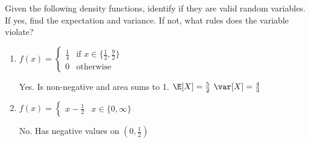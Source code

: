 \question Given the following density functions, identify if they are 
valid random variables. If yes, find the expectation and variance. If 
not, what rules does the variable violate?
\begin{enumerate}[label=(\alph*)]
\item
$f(x) = \begin{cases} \frac{1}{4} & \text{if } x \in \{\frac{1}{2}, 
\frac{9}{2}\} \\ 0 & \text{otherwise} \end{cases}$
\begin{solution}[2cm]
Yes. Is non-negative and area sums to 1.
$\E[X] = \frac{5}{2}$
$\var[X] = \frac{4}{3}$ 
\end{solution}
\item
$f(x) = \begin{cases} x - \frac{1}{2} & x \in \{0, \infty\} \end{cases}$
\begin{solution}[2cm]
No. Has negative values on $(0, \frac{1}{2})$
\end{solution}
\end{enumerate}